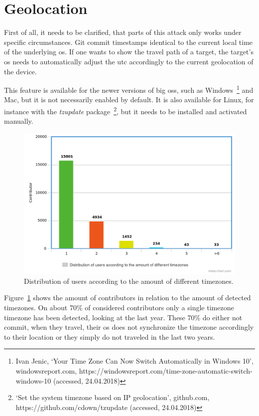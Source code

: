 \section{Geolocation}

First of all, it needs to be clarified, that parts of this attack only works under specific circumstances.
Git commit timestamps identical to the current local time of the underlying \ac{os}.
If one wants to show the travel path of a target, the target's \ac{os} needs to automatically adjust the \ac{utc} accordingly to the current geolocation of the device.

This feature is available for the newer versions of big \acp{os}, such as Windows~\footnote{Ivan Jenic, `Your Time Zone Can Now Switch Automatically in Windows 10', windowsreport.com, https://windowsreport.com/time-zone-automatic-switch-windows-10 (accessed, 24.04.2018)}
and Mac, but it is not necessarily enabled by default.
It is also available for Linux, for instance with the \emph{tzupdate} package~\footnote{`Set the system timezone based on IP geolocation', github.com, https://github.com/cdown/tzupdate (accessed, 24.04.2018)}, but it needs to be installed and activated manually.

\begin{figure}[H]
    \includegraphics[scale=0.40]{./graphs/analysis/timezone-user-distribution}
    \centering
    \caption{Distribution of users according to the amount of different timezones.}\label{fig:timezone-distribution}
\end{figure}

Figure~\ref{fig:timezone-distribution} shows the amount of contributors in relation to the amount of detected timezones.
On about 70\% of considered contributors only a single timezone timezone has been detected, looking at the last year.
These 70\% do either not commit, when they travel, their \ac{os} does not synchronize the timezone accordingly to their location or they simply do not traveled in the last two years.

